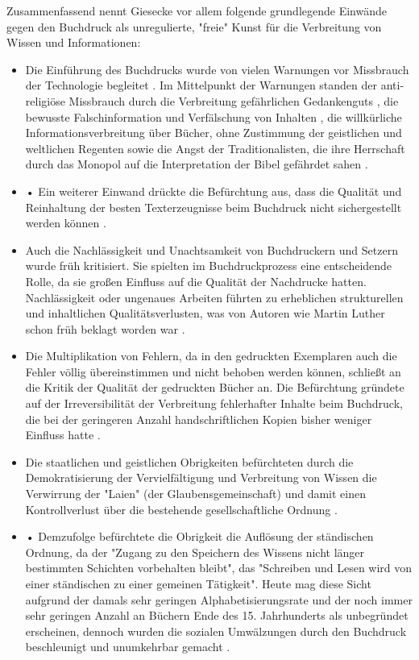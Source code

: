 Zusammenfassend nennt Giesecke vor allem folgende grundlegende Einwände gegen den Buchdruck als unregulierte, "freie" Kunst \cite{giesecke_1991_buchdruck} für die Verbreitung von Wissen und Informationen:
\begin{itemize}
\item Die Einführung des Buchdrucks wurde von vielen Warnungen vor Missbrauch der Technologie begleitet \cite{lange2008medienwettbewerb}. Im Mittelpunkt der Warnungen standen der anti-religiöse Missbrauch durch die Verbreitung gefährlichen Gedankenguts \cite{kruse2003multimedia}, die bewusste Falschinformation und Verfälschung von Inhalten \cite{sprachgeschichte_1998_besch}, die willkürliche Informationsverbreitung über Bücher, ohne Zustimmung der geistlichen und weltlichen Regenten \cite{rother_2002_siebenbuergen} sowie die Angst der Traditionalisten, die ihre Herrschaft durch das Monopol auf die Interpretation der Bibel gefährdet sahen \cite{lange2008medienwettbewerb}.
\item •	Ein weiterer Einwand drückte die Befürchtung aus, dass die Qualität und Reinhaltung der besten Texterzeugnisse beim Buchdruck nicht sichergestellt werden können \cite{giesecke_1991_buchdruck}.
\item Auch die Nachlässigkeit und Unachtsamkeit von Buchdruckern und Setzern wurde früh kritisiert. Sie spielten im Buchdruckprozess eine entscheidende Rolle, da sie großen Einfluss auf die Qualität der Nachdrucke hatten. Nachlässigkeit oder ungenaues Arbeiten führten zu erheblichen strukturellen und inhaltlichen Qualitätsverlusten, was von Autoren wie Martin Luther schon früh beklagt worden war \cite{sprachgeschichte_1998_besch} \cite{stober_2014_pressegeschichte} \cite{luther_1876}.
\item Die Multiplikation von Fehlern, da in den gedruckten Exemplaren auch die Fehler völlig übereinstimmen und nicht behoben werden können, schließt an die Kritik der Qualität der gedruckten Bücher an. Die Befürchtung gründete auf der Irreversibilität der Verbreitung fehlerhafter Inhalte beim Buchdruck, die bei der geringeren Anzahl handschriftlichen Kopien bisher weniger Einfluss hatte \cite{kittler_2004}.
\item Die staatlichen und geistlichen Obrigkeiten befürchteten durch die Demokratisierung der Vervielfältigung und Verbreitung von Wissen die Verwirrung der "Laien" (der Glaubensgemeinschaft) und damit einen Kontrollverlust über die bestehende gesellschaftliche Ordnung \cite{giesecke_1991_buchdruck}.
\item •	Demzufolge befürchtete die Obrigkeit die Auflösung der ständischen Ordnung, da der "Zugang zu den Speichern des Wissens nicht länger bestimmten Schichten vorbehalten bleibt", das "Schreiben und Lesen wird von einer ständischen zu einer gemeinen Tätigkeit". Heute mag diese Sicht aufgrund der damals sehr geringen Alphabetisierungsrate und der noch immer sehr geringen Anzahl an Büchern Ende des 15. Jahrhunderts als unbegründet erscheinen, dennoch wurden die sozialen Umwälzungen durch den Buchdruck beschleunigt und unumkehrbar gemacht \cite{giesecke_1991_buchdruck}.

\end{itemize}
